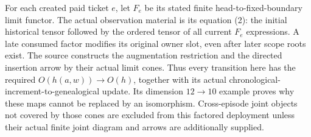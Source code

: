 \documentclass{article}
\begin{document}
For each created paid ticket $e$, let $F_e$ be its stated finite head-to-fixed-boundary limit functor. The actual observation material is its equation (2): the initial historical tensor followed by the ordered tensor of all current $F_e$ expressions. A late consumed factor modifies its original owner slot, even after later scope roots exist. The source constructs the augmentation restriction and the directed insertion arrow by their actual limit cones. Thus every transition here has the required $O(h(a,w))\to O(h)$, together with its actual chronological-increment-to-genealogical update. Its dimension $12\to10$ example proves why these maps cannot be replaced by an isomorphism. Cross-episode joint objects not covered by those cones are excluded from this factored deployment unless their actual finite joint diagram and arrows are additionally supplied.
\end{document}
